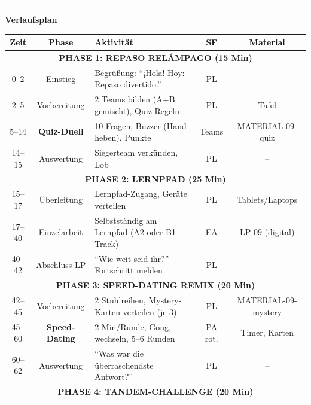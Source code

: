 \documentclass[11pt, a4paper]{article}
\begin{document}
\vspace{0.2cm}
\hrule
\vspace{0.2cm}


\textbf{\large Verlaufsplan}

\vspace{0.2cm}

\footnotesize
\begin{tabularx}{\textwidth}{|c|c|X|c|c|}
\hline
\rowcolor{spanisch!20}
\textbf{Zeit} & \textbf{Phase} & \textbf{Aktivität} & \textbf{SF} & \textbf{Material} \\
\hline
\multicolumn{5}{|c|}{\cellcolor{gamification!20}\textbf{PHASE 1: REPASO RELÁMPAGO (15 Min)}} \\
\hline
0--2 & Einstieg & Begrüßung: ``¡Hola! Hoy: Repaso divertido.'' & PL & -- \\
\hline
2--5 & Vorbereitung & 2 Teams bilden (A+B gemischt), Quiz-Regeln & PL & Tafel \\
\hline
5--14 & \textcolor{gamification}{\textbf{Quiz-Duell}} & 10 Fragen, Buzzer (Hand heben), Punkte & Teams & MATERIAL-09-quiz \\
\hline
14--15 & Auswertung & Siegerteam verkünden, Lob & PL & -- \\
\hline
\multicolumn{5}{|c|}{\cellcolor{hellgrau}\textbf{PHASE 2: LERNPFAD (25 Min)}} \\
\hline
15--17 & Überleitung & Lernpfad-Zugang, Geräte verteilen & PL & Tablets/Laptops \\
\hline
17--40 & Einzelarbeit & Selbstständig am Lernpfad (A2 oder B1 Track) & EA & LP-09 (digital) \\
\hline
40--42 & Abschluss LP & ``Wie weit seid ihr?'' -- Fortschritt melden & PL & -- \\
\hline
\multicolumn{5}{|c|}{\cellcolor{gamification!20}\textbf{PHASE 3: SPEED-DATING REMIX (20 Min)}} \\
\hline
42--45 & Vorbereitung & 2 Stuhlreihen, Mystery-Karten verteilen (je 3) & PL & MATERIAL-09-mystery \\
\hline
45--60 & \textcolor{gamification}{\textbf{Speed-Dating}} & 2 Min/Runde, Gong, wechseln, 5--6 Runden & PA rot. & Timer, Karten \\
\hline
60--62 & Auswertung & ``Was war die überraschendste Antwort?'' & PL & -- \\
\hline
\multicolumn{5}{|c|}{\cellcolor{gamification!20}\textbf{PHASE 4: TANDEM-CHALLENGE (20 Min)}} \\

\end{tabularx}
\end{document}
